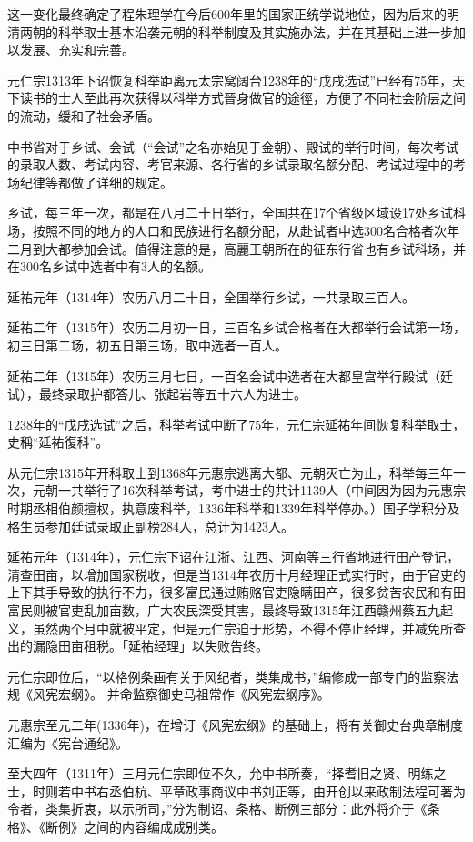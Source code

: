 这一变化最终确定了程朱理学在今后600年里的国家正统学说地位，因为后来的明清两朝的科举取士基本沿袭元朝的科举制度及其实施办法，并在其基础上进一步加以发展、充实和完善。

元仁宗1313年下诏恢复科举距离元太宗窝阔台1238年的“戊戌选试”已经有75年，天下读书的士人至此再次获得以科举方式晉身做官的途徑，方便了不同社会阶层之间的流动，缓和了社会矛盾。

中书省对于乡试、会试（“会试”之名亦始见于金朝）、殿试的举行时间，每次考试的录取人数、考试内容、考官来源、各行省的乡试录取名额分配、考试过程中的考场纪律等都做了详细的规定。

乡试，每三年一次，都是在八月二十日举行，全国共在17个省级区域设17处乡试科场，按照不同的地方的人口和民族进行名额分配，从赴试者中选300名合格者次年二月到大都参加会试。值得注意的是，高麗王朝所在的征东行省也有乡试科场，并在300名乡试中选者中有3人的名额。

延祐元年（1314年）农历八月二十日，全国举行乡试，一共录取三百人。

延祐二年（1315年）农历二月初一日，三百名乡试合格者在大都举行会试第一场，初三日第二场，初五日第三场，取中选者一百人。

延祐二年（1315年）农历三月七日，一百名会试中选者在大都皇宫举行殿试（廷试），最终录取护都答儿、张起岩等五十六人为进士。

1238年的“戊戌选试”之后，科举考试中断了75年，元仁宗延祐年间恢复科举取士，史稱“延祐復科”。

从元仁宗1315年开科取士到1368年元惠宗逃离大都、元朝灭亡为止，科举每三年一次，元朝一共举行了16次科举考试，考中进士的共计1139人（中间因为因为元惠宗时期丞相伯颜擅权，执意废科举，1336年科举和1339年科举停办。）国子学积分及格生员参加廷试录取正副榜284人，总计为1423人。

延祐元年（1314年），元仁宗下诏在江浙、江西、河南等三行省地进行田产登记，清查田亩，以增加国家税收，但是当1314年农历十月经理正式实行时，由于官吏的上下其手导致的执行不力，很多富民通过贿赂官吏隐瞒田产，很多贫苦农民和有田富民则被官吏乱加亩数，广大农民深受其害，最终导致1315年江西赣州蔡五九起义，虽然两个月中就被平定，但是元仁宗迫于形势，不得不停止经理，并减免所查出的漏隐田亩租税。「延祐经理」以失败告终。

元仁宗即位后，“以格例条画有关于风纪者，类集成书，”编修成一部专门的监察法规《风宪宏纲》。 并命监察御史马祖常作《风宪宏纲序》。

元惠宗至元二年(1336年)，在增订《风宪宏纲》的基础上，将有关御史台典章制度汇编为《宪台通纪》。

至大四年（1311年）三月元仁宗即位不久，允中书所奏，“择耆旧之贤、明练之士，时则若中书右丞伯杭、平章政事商议中书刘正等，由开创以来政制法程可著为令者，类集折衷，以示所司，”分为制诏、条格、断例三部分：此外将介于《条格》、《断例》之间的内容编成成别类。

